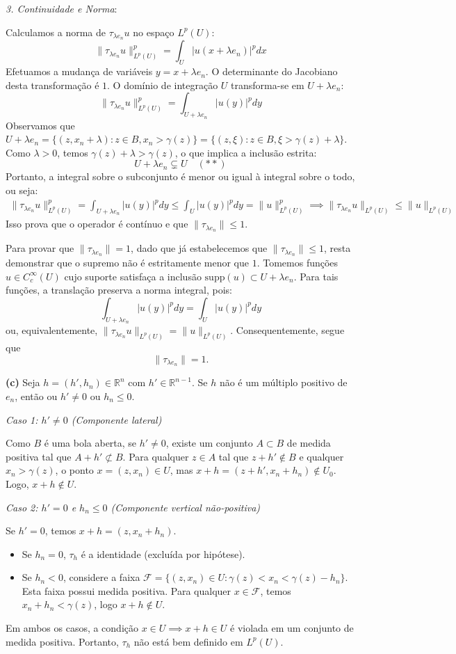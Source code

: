 \documentclass[cs_edp_2026.1.tex]{subfiles} %
\begin{document}
{	\textit{3. Continuidade e Norma}:\par
	Calculamos a norma de $\tau_{\lambda e_n} u$ no espaço $L^p(U)$:
	$$\|\tau_{\lambda e_n} u\|_{L^p(U)}^p = \int_U |u(x + \lambda e_n)|^p dx$$
	Efetuamos a mudança de variáveis $y = x + \lambda e_n$. O determinante do Jacobiano desta transformação é $1$. O domínio de integração $U$ transforma-se em $U + \lambda e_n$:
	$$\|\tau_{\lambda e_n} u\|_{L^p(U)}^p = \int_{U + \lambda e_n} |u(y)|^p dy$$
	Observamos que $U + \lambda e_n = \{ (z, x_n + \lambda) : z \in B, x_n > \gamma(z) \} = \{ (z, \xi) : z \in B, \xi > \gamma(z) + \lambda \}$.
	Como $\lambda > 0$, temos $\gamma(z) + \lambda > \gamma(z)$, o que implica a inclusão estrita:
	$$\boxed{U + \lambda e_n \subsetneq U \quad (\ast\ast)}$$
	Portanto, a integral sobre o subconjunto é menor ou igual à integral sobre o todo, ou seja:
	\begin{align*}
		\|\tau_{\lambda e_n} u\|_{L^p(U)}^p=\int_{U + \lambda e_n} |u(y)|^p dy \leq \int_U |u(y)|^p dy = \|u\|_{L^p(U)}^p \implies	\|\tau_{\lambda e_n} u\|_{L^p(U)} \leq \|u\|_{L^p(U)}
	\end{align*}
	Isso prova que o operador é contínuo e que $\|\tau_{\lambda e_n}\| \leq 1$.
	
	Para provar que $\|\tau_{\lambda e_n}\| = 1$, dado que já estabelecemos que $\|\tau_{\lambda e_n}\| \le 1$, resta demonstrar que o supremo não é estritamente menor que $1$. Tomemos funções $u \in C_c^\infty(U)$ cujo suporte satisfaça a inclusão $\text{supp}(u) \subset U + \lambda e_n$. Para tais funções, a translação preserva a norma integral, pois:
	$$\int_{U + \lambda e_n} |u(y)|^p dy = \int_U |u(y)|^p dy$$
	ou, equivalentemente, $\|\tau_{\lambda e_n} u\|_{L^p(U)} = \|u\|_{L^p(U)}$. Consequentemente, segue que 
	$$\boxed{\|\tau_{\lambda e_n}\| = 1.}$$
	
	\textbf{(c)} Seja $h = (h', h_n) \in \mathbb{R}^n$ com $h' \in \mathbb{R}^{n-1}$. Se $h$ não é um múltiplo positivo de $e_n$, então ou $h' \neq 0$ ou $h_n \le 0$.
	
	\textit{Caso 1: $h' \neq 0$ (Componente lateral)}\par
	Como $B$ é uma bola aberta, se $h' \neq 0$, existe um conjunto $A \subset B$ de medida positiva tal que $A + h' \not\subset B$. Para qualquer $z \in A$ tal que $z + h' \notin B$ e qualquer $x_n > \gamma(z)$, o ponto $x = (z, x_n) \in U$, mas $x + h = (z + h', x_n + h_n) \notin U_0$. Logo, $x+h \notin U$.
	
	\textit{Caso 2: $h' = 0$ e $h_n \le 0$ (Componente vertical não-positiva)}\par
	Se $h' = 0$, temos $x+h = (z, x_n + h_n)$. 
	\begin{itemize}
		\item Se $h_n = 0$, $\tau_h$ é a identidade (excluída por hipótese).
		\item Se $h_n < 0$, considere a faixa $\mathcal{F} = \{ (z, x_n) \in U : \gamma(z) < x_n < \gamma(z) - h_n \}$. Esta faixa possui medida positiva. Para qualquer $x \in \mathcal{F}$, temos $x_n + h_n < \gamma(z)$, logo $x+h \notin U$.
	\end{itemize}
	Em ambos os casos, a condição $x \in U \implies x+h \in U$ é violada em um conjunto de medida positiva. Portanto, $\tau_h$ não está bem definido em $L^p(U)$.
	
}
\end{document}
